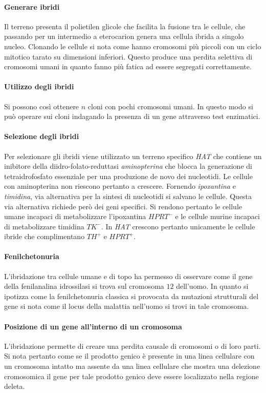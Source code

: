 			\paragraph{Generare ibridi}
			Il terreno presenta il polietilen glicole che facilita la fusione tra le cellule, che passando per un intermedio a eterocarion genera una cellula ibrida a singolo nucleo.
			Clonando le cellule si nota come hanno cromosomi pi\`u piccoli con un ciclo mitotico tarato su dimensioni inferiori.
			Questo produce una perdita selettiva di cromosomi umani in quanto fanno pi\`u fatica ad essere segregati correttamente.

			\paragraph{Utilizzo degli ibridi}
			Si possono cos\`i ottenere $n$ cloni con pochi cromosomi umani.
			In questo modo si pu\`o operare sui cloni indagando la presenza di un gene attraverso test enzimatici.

			\paragraph{Selezione degli ibridi}
			Per selezionare gli ibridi viene utilizzato un terreno specifico \emph{HAT} che contiene un inibitore della diidro-folato-reduttasi \emph{aminopterina} che blocca la generazione di tetraidrofosfato essenziale per una produzione de novo dei nucleotidi.
			Le cellule con aminopterina non riescono pertanto a crescere.
			Fornendo \emph{ipoxantina} e \emph{timidina}, via alternativa per la sintesi di nucleotidi si salvano le cellule.
			Questa via alternativa richiede per\`o dei geni specifici.
			Si rendono pertanto le cellule umane incapaci di metabolizzare l'ipoxantina \emph{$HPRT^-$} e le cellule murine incapaci di metabolizzare timidina \emph{$TK^-$}.
			In \emph{HAT} crescono pertanto unicamente le cellule ibride che complimentano \emph{$TH^+$} e \emph{$HPRT^+$}.

			\paragraph{Fenilchetonuria}
			L'ibridazione tra cellule umane e di topo ha permesso di osservare come il gene della fenilanalina idrossilasi si trova sul cromosoma $12$ dell'uomo.
			In quanto si ipotizza come la fenilchetonuria classica si provocata da mutazioni strutturali del gene si nota come il locus della malattia nell'uomo si trovi in tale cromosoma.

			\paragraph{Posizione di un gene all'interno di un cromosoma}
			L'ibridazione permette di creare una perdita causale di cromosomi o di loro parti.
			Si nota pertanto come se il prodotto genico \`e presente in una linea cellulare con un cromosoma intatto ma assente da una linea cellulare che mostra una delezione cromosomica il gene per tale prodotto genico deve essere localizzato nella regione deleta.
